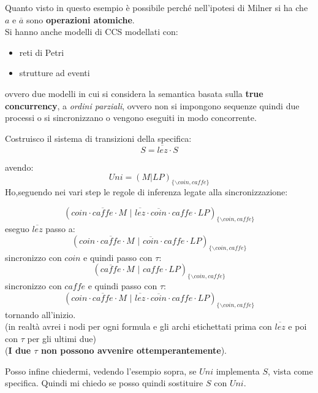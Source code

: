 \documentclass[a4paper,12pt, oneside]{book}
\begin{document}
Quanto visto in questo esempio è possibile perché nell'ipotesi di Milner si ha
che $a$ e $\overline{a}$ sono \textbf{operazioni atomiche}.\\
Si hanno anche modelli di CCS modellati con:
\begin{itemize}
  \item reti di Petri
  \item strutture ad eventi
\end{itemize}
ovvero due modelli in cui si considera la semantica basata sulla \textbf{true
  concurrency}, a \textit{ordini parziali}, ovvero non si impongono sequenze
quindi due processi o si sincronizzano o vengono eseguiti in modo concorrente.
\begin{esempio}
  Costruisco il sistema di transizioni della specifica:
  \[S=\overline{lez}\cdot S\]
  \begin{center}
  \end{center}
  avendo:
  \[Uni=(M|LP)_{\{\backslash coin, caffe\}}\]
  Ho,seguendo nei vari step le regole di inferenza legate alla
  sincronizzazione:
  
  \[(coin\cdot \overline{caffe}\cdot
    M\,\,|\,\,\overline{lez}\cdot\overline{coin}\cdot caffe\cdot
    LP)_{\{\backslash coin, caffe\}}\]
  eseguo $\overline{lez}$ passo a:
  \[(coin\cdot \overline{caffe}\cdot
    M\,\,|\,\,\overline{coin}\cdot caffe\cdot
    LP)_{\{\backslash coin, caffe\}}\]
  sincronizzo con $coin$ e quindi passo con $\tau$:
  \[(\overline{caffe}\cdot
    M\,\,|\,\, caffe\cdot
    LP)_{\{\backslash coin, caffe\}}\]
  sincronizzo con $caffe$ e quindi passo con $\tau$:
   \[(coin\cdot \overline{caffe}\cdot
    M\,\,|\,\,\overline{lez}\cdot\overline{coin}\cdot caffe\cdot
    LP)_{\{\backslash coin, caffe\}}\]
  tornando all'inizio.\\
  (in realtà avrei i nodi per ogni formula e gli archi etichettati prima con
  $\overline{lez}$ e poi con $\tau$ per gli ultimi due)\\
  (\textbf{I due $\tau$ non possono avvenire ottemperantemente}).\\
  
\end{esempio}
Posso infine chiedermi, vedendo l'esempio sopra, se $Uni$ implementa $S$, vista
come specifica. Quindi mi chiedo se posso quindi sostituire $S$ con $Uni$.\\
\end{document}
